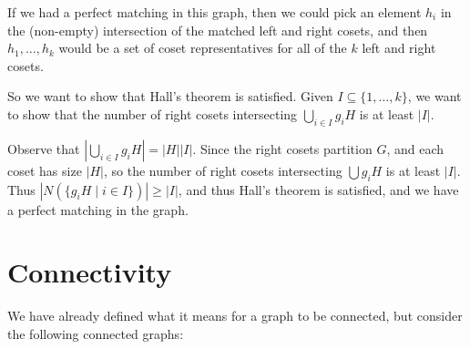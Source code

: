 \documentclass[a4paper]{scrreprt}
\begin{document}
\begin{example}
\begin{center}

\end{center}

If we had a perfect matching in this graph, then we could pick an element $h_i$ in the (non-empty) intersection of the matched left and right cosets, and then $h_1, \dots, h_k$ would be a set of coset representatives for all of the $k$ left and right cosets.

So we want to show that Hall's theorem is satisfied.
Given $I \subseteq \{1, \dots, k\}$, we want to show that the number of right cosets intersecting $\bigcup_{i \in I} g_i H$ is at least $|I|$.

Observe that $\left|\bigcup_{i \in I} g_i H\right| = |H| |I|$. Since the right cosets partition $G$, and each coset has size $|H|$, so the number of right cosets intersecting $\bigcup g_i H$ is at least $|I|$. Thus $|N(\{g_iH \mid i \in I\})| \geq |I|$, and thus Hall's theorem is satisfied, and we have a perfect matching in the graph.

\end{example}

\chapter{Connectivity}

We have already defined what it means for a graph to be connected, but consider the following connected graphs:
\end{document}
